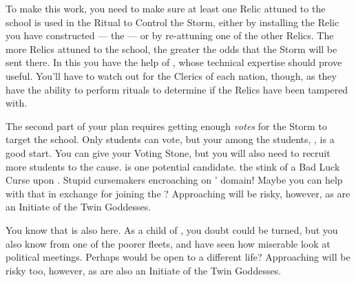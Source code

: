 \documentclass[char]{GL2020}
\begin{document}
To make this work, you need to make sure at least one Relic attuned to the school is used in the Ritual to Control the Storm, either by installing the Relic you have constructed — the \iHorseshoe{} — or by re-attuning one of the other Relics. The more Relics attuned to the school, the greater the odds that the Storm will be sent there. In this you have the help of \cChupInventor{}, whose technical expertise should prove useful. You'll have to watch out for the Clerics of each nation, though, as they have the ability to perform rituals to determine if the Relics have been tampered with. 

The second part of your plan requires getting enough \emph{votes} for the Storm to target the school. Only students can vote, but your \pGoatie{} among the students, \cChupStudent{}, is a good start. You can give \cChupStudent{\them} your Voting Stone, but you will also need to recruit more students to the cause. \cInitiate{\full} is one potential candidate. \cInitiate{\They} \cInitiate{\have} the stink of a Bad Luck Curse upon \cInitiate{\them}. Stupid \pFarm{} cursemakers encroaching on \cGenesis{}' domain! Maybe you can help \cInitiate{\them} with that in exchange for joining the \pGoaties{}? Approaching \cInitiate{\them} will be risky, however, as \cInitiate{\they} are an Initiate of the Twin Goddesses. 

You know that \cWarlordDaughter{\full} is also here. As a child of \cLoud{}, you doubt \cWarlordDaughter{\they} could be turned, but you also know \cWarlordDaughter{\they} \cWarlordDaughter{\are} from one of the poorer fleets, and have seen how miserable \cWarlordDaughter{\they} look\cWarlordDaughter{\verbs} at political meetings. Perhaps \cWarlordDaughter{\they} would be open to a different life? Approaching \cWarlordDaughter{} will be risky too, however, as \cWarlordDaughter{\they} are also an Initiate of the Twin Goddesses. 
\end{document}

